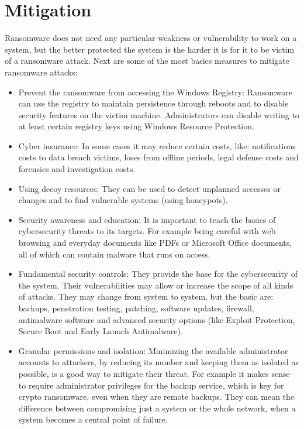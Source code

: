 \section{Mitigation}
Ransomware does not need any particular weakness or vulnerability to work on a system, but the better protected the system is the harder it is for it to be victim of a ransomware attack.
Next are some of the most basics measures to mitigate ransomware attacks\cite{ransomware_oReilly}\cite{ransomware_digital_extortion}\cite{hardening_windows_10}:
\begin{itemize}
	\item Prevent the ransomware from accessing the Windows Registry:
Ransomware can use the registry to maintain persistence through reboots and to disable security features on the victim machine.
Administrators can disable writing to at least certain registry keys using Windows Resource Protection.
	\item Cyber insurance:
In some cases it may reduce certain costs, like: notifications costs to data breach victims, loses from offline periods, legal defense costs and forensics and investigation costs.
	\item Using decoy resources:
They can be used to detect unplanned accesses or changes and to find vulnerable systems (using honeypots).
	\item Security awareness and education:
It is important to teach the basics of cybersecurity threats to its targets.
For example being careful with web browsing and everyday documents like PDFs or Microsoft Office documents, all of which can contain malware that runs on access.
	\item Fundamental security controls:
They provide the base for the cybersecurity of the system.
Their vulnerabilities may allow or increase the scope of all kinds of attacks.
They may change from system to system, but the basic are: backups, penetration testing, patching, software updates, firewall, antimalware software and advanced security options (like Exploit Protection, Secure Boot and Early Launch Antimalware).
	\item Granular permissions and isolation:
Minimizing the available administrator accounts to attackers, by reducing its number and keeping them as isolated as possible, is a good way to mitigate their threat.
For example it makes sense to require administrator privileges for the backup service, which is key for crypto ransomware, even when they are remote backups.
They can mean the difference between compromising just a system or the whole network, when a system becomes a central point of failure.

\end{itemize}
